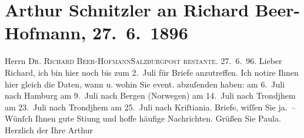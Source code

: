

         
         \renewcommand{\erwaehntePersonen}{Personen: Richard Beer-Hofmann, Paula Beer-Hofmann, Otto Brahm}
         \renewcommand{\erwaehnteOrte}{Orte: Bergen, Hamburg, I., Innere Stadt, Oslo, Salzburg, Trondheim, Wien}
         \renewcommand{\erwaehnteWerke}{}
               \section[Arthur Schnitzler an Richard Beer-Hofmann, 27. 6. 1896]{ Arthur Schnitzler an Richard Beer-Hofmann,
               27. 6. 1896}\nopagebreak{}\rehead{ }\begin{ledgroupsized}[t]{13cm}\normalsize\beginnumbering \toendnotes[C]{\smallbreak\pagebreak[2]} 
\toendnotes[C]{\smallbreak}\pstart{}{\pb}Herrn \textsc{Dr. Richard
                     Beer-Hofmann}\pend{}\pstart{}\textsc{Salzburg}\pend{}\pstart{}\textsc{post restante.}\pend{}{\bigskip}\pstart
           \raggedleft{}{\pb}27. 6. 96. \pend
           \pstart
           Lieber Richard, ich bin hier noch bis zum 2. Juli
               für Briefe anzutreffen. Ich notire Ihnen hier gleich die Daten, wann u. wohin Sie
               event.  abzuſenden haben:\pend
           \pstart
           am 6. Juli nach Hamburg\pend
           \pstart
           am 9. Juli nach Bergen (Norwegen)\pend
           \pstart
           am 14. Juli nach Trondjhem\pend
           \pstart
           am 23. Juli nach Trondjhem\pend
           \pstart
           am 25. Juli nach Kriſtiania.\pend
           \pstart
           Briefe, wiſſen Sie ja. –\pend
           \pstart
           Wünſch Ihnen gute Sti{\geminationm}ung und hoffe häufige Nachrichten.
               Grüßen Sie Paula. Herzlich der Ihre
                  \spacefill\mbox{Arthur}\pend
           \pstart
           \noindent{}\label{T_L00555_1v}\label{T_L00555_1h}\pend
           

\end{ledgroupsized}
